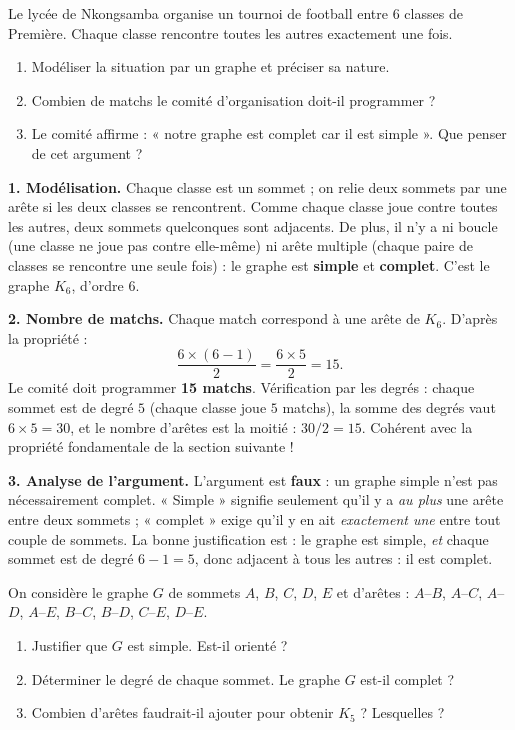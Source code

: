 \documentclass[11pt]{article}
\begin{document}
\begin{exoresolu}
Le lycée de Nkongsamba organise un tournoi de football entre $6$ classes de Première. Chaque classe rencontre toutes les autres exactement une fois.
\begin{enumerate}
\item Modéliser la situation par un graphe et préciser sa nature.
\item Combien de matchs le comité d'organisation doit-il programmer ?
\item Le comité affirme : « notre graphe est complet car il est simple ». Que penser de cet argument ?
\end{enumerate}
\tcblower
\textbf{1. Modélisation.} Chaque classe est un sommet ; on relie deux sommets par une arête si les deux classes se rencontrent. Comme chaque classe joue contre toutes les autres, deux sommets quelconques sont adjacents. De plus, il n'y a ni boucle (une classe ne joue pas contre elle-même) ni arête multiple (chaque paire de classes se rencontre une seule fois) : le graphe est \textbf{simple} et \textbf{complet}. C'est le graphe $K_6$, d'ordre $6$.

\textbf{2. Nombre de matchs.} Chaque match correspond à une arête de $K_6$. D'après la propriété :
\[ \frac{6 \times (6-1)}{2} = \frac{6 \times 5}{2} = 15. \]
Le comité doit programmer \textbf{15 matchs}. Vérification par les degrés : chaque sommet est de degré $5$ (chaque classe joue $5$ matchs), la somme des degrés vaut $6 \times 5 = 30$, et le nombre d'arêtes est la moitié : $30/2 = 15$. Cohérent avec la propriété fondamentale de la section suivante !

\textbf{3. Analyse de l'argument.} L'argument est \textbf{faux} : un graphe simple n'est pas nécessairement complet. « Simple » signifie seulement qu'il y a \emph{au plus} une arête entre deux sommets ; « complet » exige qu'il y en ait \emph{exactement une} entre tout couple de sommets. La bonne justification est : le graphe est simple, \emph{et} chaque sommet est de degré $6-1 = 5$, donc adjacent à tous les autres : il est complet.
\end{exoresolu}

\begin{exercice}
On considère le graphe $G$ de sommets $A$, $B$, $C$, $D$, $E$ et d'arêtes : $A$--$B$, $A$--$C$, $A$--$D$, $A$--$E$, $B$--$C$, $B$--$D$, $C$--$E$, $D$--$E$.
\begin{enumerate}
\item Justifier que $G$ est simple. Est-il orienté ?
\item Déterminer le degré de chaque sommet. Le graphe $G$ est-il complet ?
\item Combien d'arêtes faudrait-il ajouter pour obtenir $K_5$ ? Lesquelles ?
\end{enumerate}
\end{exercice}
\end{document}
